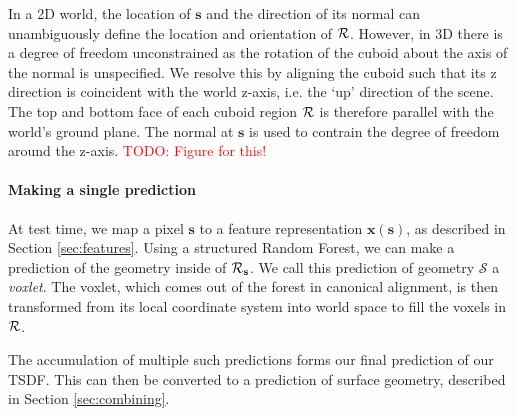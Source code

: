 \documentclass[10pt,twocolumn,letterpaper]{article}
\makeatletter
\renewcommand*{\ie}{i.e.\@\xspace}
\newcommand{\feat}{\mathbf{x}}
\newcommand{\rgbdimage}{\mathcal{D}}
\newcommand{\pixelidx}{\mathbf{s}}
\newcommand{\project}{\mathbf{p}}
\newcommand{\point}{\mathbf{p}}
\newcommand{\normal}{\mathbf{n}}
\newcommand{\updir}{\mathbf{u}}
\newcommand{\todo}[1]{\textcolor{red}{TODO: #1}}
\newcommand{\remove}[1]{\textcolor{grey}{#1}}
\makeatother
\begin{document}
In a 2D world, the location of $\pixelidx$ and the direction of its normal can unambiguously define the location and orientation of $\mathcal{R}$.
However, in 3D there is a degree of freedom unconstrained as the rotation of the cuboid about the axis of the normal is unspecified.
We resolve this by aligning the cuboid such that its z direction is coincident with the world z-axis, \ie the `up' direction of the scene.
The top and bottom face of each cuboid region $\mathcal{R}$ is therefore parallel with the world's ground plane.
The normal at $\pixelidx$ is used to contrain the degree of freedom around the z-axis.
\todo{Figure for this!}


\paragraph{Making a single prediction}
At test time, we map a pixel $\pixelidx$ to a feature representation $\feat(\pixelidx)$, as described in Section \ref{sec:features}.
Using a structured Random Forest, we can make a prediction of the geometry inside of $\voxregion_\pixelidx$.
We call this prediction of geometry $\mathcal{S}$ a \emph{voxlet}.
The voxlet, which comes out of the forest in canonical alignment, is then transformed from its local coordinate system into world space to fill the voxels in $\mathcal{R}$.

The accumulation of multiple such predictions forms our final prediction of our TSDF.
This can then be converted to a prediction of surface geometry, described in Section \ref{sec:combining}.
\end{document}
